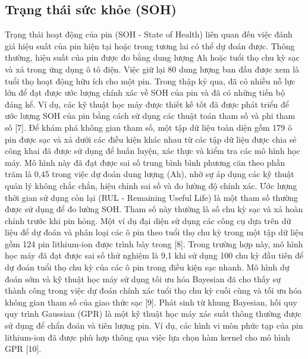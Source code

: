 \documentclass[a4paper,11pt]{article}
\theoremstyle{mytheor}
\begin{document}
\subsection{Trạng thái sức khỏe (SOH)}
Trạng thái hoạt động của pin (SOH - State of Health) liên quan đến việc đánh giá hiệu suất của pin hiện tại hoặc trong tương lai có thể dự đoán được. Thông thường, hiệu suất của pin được đo bằng dung lượng Ah hoặc tuổi thọ chu kỳ sạc và xả trong ứng dụng ô tô điện. Việc giữ lại 80 dung lượng ban đầu được xem là tuổi thọ hoạt động hữu ích cho một pin. Trong thập kỷ qua, đã có nhiều nỗ lực lớn để đạt được ước lượng chính xác về SOH của pin và đã có những tiến bộ đáng kể. Ví dụ, các kỹ thuật học máy được thiết kế tốt đã được phát triển để ước lượng SOH của pin bằng cách sử dụng các thuật toán tham số và phi tham số [7]. Để khám phá không gian tham số, một tập dữ liệu toàn diện gồm 179 ô pin được sạc và xả dưới các điều kiện khác nhau từ các tập dữ liệu được chia sẻ công khai đã được sử dụng để huấn luyện, xác thực và kiểm tra các mô hình học máy. Mô hình này đã đạt được sai số trung bình bình phương căn theo phần trăm là 0,45 trong việc dự đoán dung lượng (Ah), nhờ sự áp dụng các kỹ thuật quản lý không chắc chắn, hiệu chỉnh sai số và đo lường độ chính xác. Ước lượng thời gian sử dụng còn lại (RUL - Remaining Useful Life) là một tham số thường được sử dụng để đo lường SOH. Tham số này thường là số chu kỳ sạc và xả hoàn chỉnh trước khi pin hỏng. Một ví dụ đại diện sử dụng các công cụ dựa trên dữ liệu để dự đoán và phân loại các ô pin theo tuổi thọ chu kỳ trong một tập dữ liệu gồm 124 pin lithium-ion được trình bày trong [8]. Trong trường hợp này, mô hình học máy đã đạt được sai số thử nghiệm là 9,1 khi sử dụng 100 chu kỳ đầu tiên để dự đoán tuổi thọ chu kỳ của các ô pin trong điều kiện sạc nhanh. Mô hình dự đoán sớm và kỹ thuật học máy sử dụng tối ưu hóa Bayesian đã cho thấy sự thành công trong việc dự đoán chính xác tuổi thọ chu kỳ cuối cùng và tối ưu hóa không gian tham số của giao thức sạc [9]. Phát sinh từ khung Bayesian, hồi quy quy trình Gaussian (GPR) là một kỹ thuật học máy xác suất thông thường được sử dụng để chẩn đoán và tiên lượng pin. Ví dụ, các hình vi mòn phức tạp của pin lithium-ion đã được phù hợp thông qua việc lựa chọn hàm kernel cho mô hình GPR [10].\\
\end{document}
